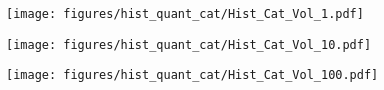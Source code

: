 \begin{multicols}{3}
    \begin{minipage}{\columnwidth}
        \begin{figure}[H]
            \texttt{[image: figures/hist\_quant\_cat/Hist\_Cat\_Vol\_1.pdf]}
        \end{figure} 
    \end{minipage}
    
    \begin{minipage}{\columnwidth}
        \begin{figure}[H]
            \texttt{[image: figures/hist\_quant\_cat/Hist\_Cat\_Vol\_10.pdf]}
        \end{figure} 
    \end{minipage}
    
    \begin{minipage}{\columnwidth}
        \begin{figure}[H]
            \hspace{0.8cm}\centering
            \texttt{[image: figures/hist\_quant\_cat/Hist\_Cat\_Vol\_100.pdf]}
        \end{figure} 
    \end{minipage}
    
    \end{multicols}

